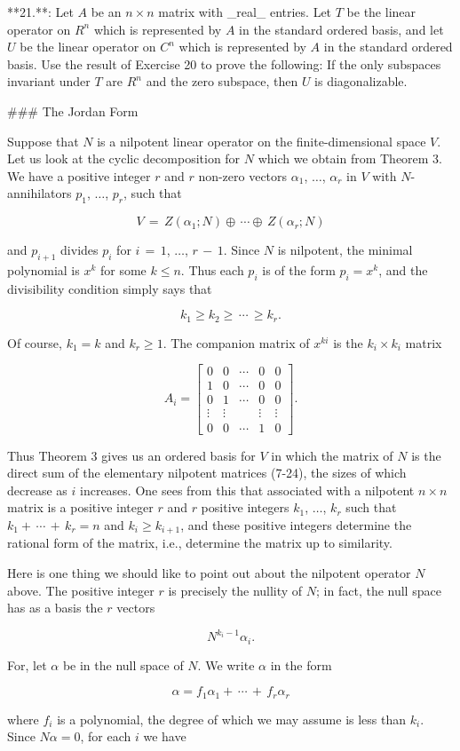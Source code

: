 

**21.**: Let \(A\) be an \(n\times n\) matrix with _real_ entries. Let \(T\) be the linear operator on \(R^{n}\) which is represented by \(A\) in the standard ordered basis, and let \(U\) be the linear operator on \(C^{n}\) which is represented by \(A\) in the standard ordered basis. Use the result of Exercise 20 to prove the following: If the only subspaces invariant under \(T\) are \(R^{n}\) and the zero subspace, then \(U\) is diagonalizable.

### The Jordan Form

Suppose that \(N\) is a nilpotent linear operator on the finite-dimensional space \(V\). Let us look at the cyclic decomposition for \(N\) which we obtain from Theorem 3. We have a positive integer \(r\) and \(r\) non-zero vectors \(\alpha_{1}\), \(\ldots\), \(\alpha_{r}\) in \(V\) with \(N\)-annihilators \(p_{1}\), \(\ldots\), \(p_{r}\), such that

\[V\,=\,Z(\alpha_{1};N)\oplus\,\cdots\oplus\,Z(\alpha_{r};N)\]

and \(p_{i+1}\) divides \(p_{i}\) for \(i\,=\,1\), \(\ldots\), \(r\,-\,1\). Since \(N\) is nilpotent, the minimal polynomial is \(x^{k}\) for some \(k\leq n\). Thus each \(p_{i}\) is of the form \(p_{i}=x^{k}\), and the divisibility condition simply says that

\[k_{1}\geq k_{2}\geq\,\cdots\,\geq k_{r}.\]

Of course, \(k_{1}=k\) and \(k_{r}\geq 1\). The companion matrix of \(x^{ki}\) is the \(k_{i}\times k_{i}\) matrix

\[A_{i}=\begin{bmatrix}0&0&\cdots&0&0\\ 1&0&\cdots&0&0\\ 0&1&\cdots&0&0\\ \vdots&\vdots&&\vdots&\vdots\\ 0&0&\cdots&1&0\end{bmatrix}.\]

Thus Theorem 3 gives us an ordered basis for \(V\) in which the matrix of \(N\) is the direct sum of the elementary nilpotent matrices (7-24), the sizes of which decrease as \(i\) increases. One sees from this that associated with a nilpotent \(n\times n\) matrix is a positive integer \(r\) and \(r\) positive integers \(k_{1}\), \(\ldots\), \(k_{r}\) such that \(k_{1}+\,\cdots\,+\,k_{r}=n\) and \(k_{i}\geq k_{i+1}\), and these positive integers determine the rational form of the matrix, i.e., determine the matrix up to similarity.

Here is one thing we should like to point out about the nilpotent operator \(N\) above. The positive integer \(r\) is precisely the nullity of \(N\); in fact, the null space has as a basis the \(r\) vectors

\[N^{k_{i}-1}\alpha_{i}.\]

For, let \(\alpha\) be in the null space of \(N\). We write \(\alpha\) in the form

\[\alpha=f_{1}\alpha_{1}+\,\cdots\,+\,f_{r}\alpha_{r}\]

where \(f_{i}\) is a polynomial, the degree of which we may assume is less than \(k_{i}\). Since \(N\alpha=0\), for each \(i\) we have